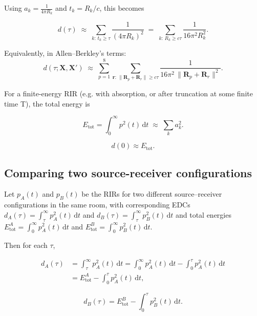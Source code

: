 \documentclass[conference]{IEEEtran}
\begin{document}
Using $a_k = \frac{1}{4 \pi R_k}$ and $t_k = R_k/c$, this becomes

\begin{equation}
d(\tau)
  \;\approx\;
  \sum_{k :\, t_k \ge \tau} \frac{1}{(4\pi R_k)^2}
  \;=\;
  \sum_{k :\, R_k \ge c\tau} \frac{1}{16\pi^2 R_k^2}.
\label{eq:edc-Rk}
\end{equation}

Equivalently, in Allen–Berkley’s terms:
\begin{equation}
d(\tau;\mathbf X,\mathbf X')
  \;\approx\;
  \sum_{p=1}^{8}
  \sum_{\mathbf r:\,\lVert \mathbf R_p + \mathbf R_r \rVert \ge c\tau}
    \frac{1}{16\pi^2 \,\lVert \mathbf R_p + \mathbf R_r \rVert^2}.
\label{eq:edc-AB}
\end{equation}

For a finite-energy RIR (e.g. with absorption, or after truncation at some finite time T), the total energy is

\begin{equation}
E_{\mathrm{tot}}
  = \int_0^{\infty} p^2(t)\,\mathrm dt
  \;\approx\; \sum_k a_k^2.
\label{eq:Etot-def}
\end{equation}

\begin{equation}
d(0) \approx E_{\mathrm{tot}}.
\end{equation}

\subsection{Comparing two source-receiver configurations}

Let $p_A(t)$ and $p_B(t)$ be the RIRs for two different source–receiver configurations in the same room, with corresponding EDCs
$d_A(\tau) = \int_{\tau}^{\infty} p_A^2(t)\,\mathrm dt$ and $d_B(\tau)=\int_{\tau}^{\infty} p_B^2(t)\,\mathrm dt$ 
and total energies $E_{\mathrm{tot}}^{A} = \int_0^{\infty} p_A^2(t)\,\mathrm dt$ and $E_{\mathrm{tot}}^{B} = \int_0^{\infty} p_B^2(t)\,\mathrm dt$.

Then for each $\tau$,

\begin{align}
d_A(\tau)
  &= \int_{\tau}^{\infty} p_A^2(t)\,\mathrm dt
   = \int_0^{\infty} p_A^2(t)\,\mathrm dt
     - \int_0^{\tau} p_A^2(t)\,\mathrm dt
\\
  &= E_{\mathrm{tot}}^{A}
     - \int_0^{\tau} p_A^2(t)\,\mathrm dt,
\label{eq:dA-split}
\end{align}

\begin{equation}
d_B(\tau)
  = E_{\mathrm{tot}}^{B}
    - \int_0^{\tau} p_B^2(t)\,\mathrm dt.
\label{eq:dB-split}
\end{equation}
\end{document}
